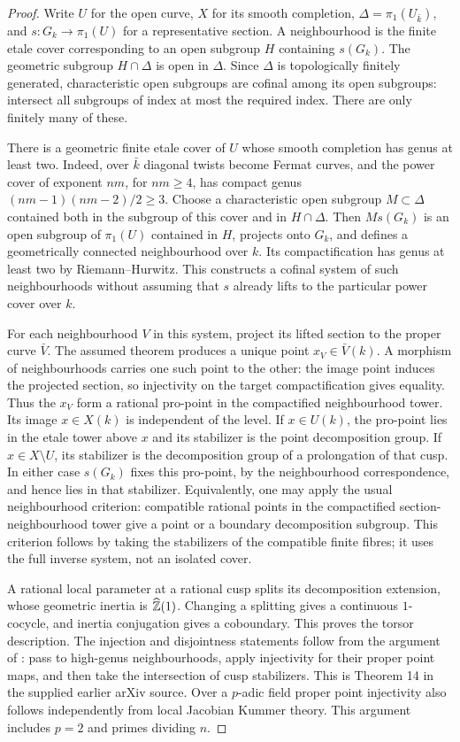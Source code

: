 \begin{proof}
Write $U$ for the open curve, $X$ for its smooth completion, $\Delta=\pi_1(U_{\bar k})$, and $s:G_k\to\pi_1(U)$ for a representative section. A neighbourhood is the finite etale cover corresponding to an open subgroup $H$ containing $s(G_k)$. The geometric subgroup $H\cap\Delta$ is open in $\Delta$. Since $\Delta$ is topologically finitely generated, characteristic open subgroups are cofinal among its open subgroups: intersect all subgroups of index at most the required index. There are only finitely many of these.

There is a geometric finite etale cover of $U$ whose smooth completion has genus at least two. Indeed, over $\bar k$ diagonal twists become Fermat curves, and the power cover of exponent $nm$, for $nm\ge4$, has compact genus $(nm-1)(nm-2)/2\ge3$. Choose a characteristic open subgroup $M\subset\Delta$ contained both in the subgroup of this cover and in $H\cap\Delta$. Then $Ms(G_k)$ is an open subgroup of $\pi_1(U)$ contained in $H$, projects onto $G_k$, and defines a geometrically connected neighbourhood over $k$. Its compactification has genus at least two by Riemann--Hurwitz. This constructs a cofinal system of such neighbourhoods without assuming that $s$ already lifts to the particular power cover over $k$.

For each neighbourhood $V$ in this system, project its lifted section to the proper curve $\bar V$. The assumed theorem produces a unique point $x_V\in\bar V(k)$. A morphism of neighbourhoods carries one such point to the other: the image point induces the projected section, so injectivity on the target compactification gives equality. Thus the $x_V$ form a rational pro-point in the compactified neighbourhood tower. Its image $x\in X(k)$ is independent of the level. If $x\in U(k)$, the pro-point lies in the etale tower above $x$ and its stabilizer is the point decomposition group. If $x\in X\setminus U$, its stabilizer is the decomposition group of a prolongation of that cusp. In either case $s(G_k)$ fixes this pro-point, by the neighbourhood correspondence, and hence lies in that stabilizer. Equivalently, one may apply the usual neighbourhood criterion: compatible rational points in the compactified section-neighbourhood tower give a point or a boundary decomposition subgroup. This criterion follows by taking the stabilizers of the compatible finite fibres; it uses the full inverse system, not an isolated cover.

A rational local parameter at a rational cusp splits its decomposition extension, whose geometric inertia is $\widehat{\mathbb Z}(1)$. Changing a splitting gives a continuous $1$-cocycle, and inertia conjugation gives a coboundary. This proves the torsor description. The injection and disjointness statements follow from the argument of \citet[Theorem 17]{StixCuspidal}: pass to high-genus neighbourhoods, apply injectivity for their proper point maps, and then take the intersection of cusp stabilizers. This is Theorem 14 in the supplied earlier arXiv source. Over a $p$-adic field proper point injectivity also follows independently from local Jacobian Kummer theory. This argument includes $p=2$ and primes dividing $n$.
\end{proof}

